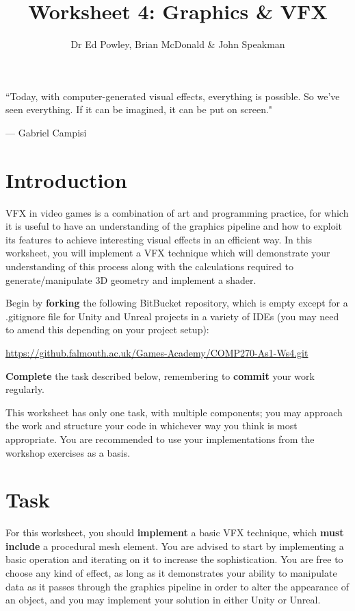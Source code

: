 \documentclass{../../../fal_assignment}
\title{Worksheet 4: Graphics \& VFX}
\author{Dr Ed Powley, Brian McDonald \& John Speakman}
\begin{document}
\maketitle

\begin{marginquote}
``Today, with computer-generated visual effects, everything is possible. So we've seen everything. If it can be imagined, it can be put on screen."

\par --- Gabriel Campisi
\end{marginquote}
\section*{Introduction}

VFX in video games is a combination of art and programming practice, for which it is useful to have an understanding of the graphics pipeline and how to exploit its features to achieve interesting visual effects in an efficient way. In this worksheet, you will implement a VFX technique which will demonstrate your understanding of this process along with the calculations required to generate/manipulate 3D geometry and implement a shader.

Begin by \textbf{forking} the following BitBucket repository, which is empty except for a .gitignore file for Unity and Unreal projects in a variety of IDEs (you may need to amend this depending on your project setup):

\begin{center}
	\url{https://github.falmouth.ac.uk/Games-Academy/COMP270-As1-Ws4.git}
\end{center}

\textbf{Complete} the task described below, remembering to \textbf{commit} your work regularly.

This worksheet has only one task, with multiple components; you may approach the work and structure your code in whichever way you think is most appropriate. You are recommended to use your implementations from the workshop exercises as a basis.

\section*{Task}
For this worksheet, you should \textbf{implement} a basic VFX technique, which \textbf{must include} a procedural mesh element. You are advised to start by implementing a basic operation and iterating on it to increase the sophistication. You are free to choose any kind of effect, as long as it demonstrates your ability to manipulate data as it passes through the graphics pipeline in order to alter the appearance of an object, and you may implement your solution in either Unity or Unreal.
\end{document}
